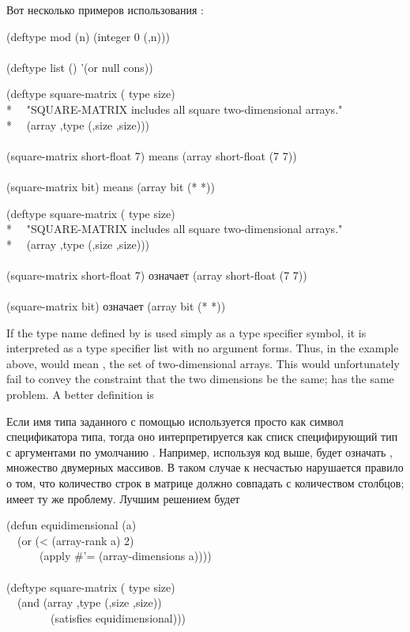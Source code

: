 \begin{defmac}
Вот несколько примеров использования :
\begin{lisp}
(deftype mod (n) {\Xbq}(integer 0 (,n))) \\
 \\
(deftype list () '(or null cons))
\end{lisp}


\begin{lisp}
(deftype square-matrix ( type size) \\*
~~"SQUARE-MATRIX includes all square two-dimensional arrays." \\*
~~{\Xbq}(array ,type (,size ,size))) \\
 \\
(square-matrix short-float 7)  \textrm{means}  (array short-float (7 7)) \\
 \\
(square-matrix bit)  \textrm{means}  (array bit (* *))
\end{lisp}

\begin{lisp}
(deftype square-matrix ( type size) \\*
~~"SQUARE-MATRIX includes all square two-dimensional arrays." \\*
~~{\Xbq}(array ,type (,size ,size))) \\
 \\
(square-matrix short-float 7)  \textrm{означает}  (array short-float (7 7)) \\
 \\
(square-matrix bit)  \textrm{означает}  (array bit (* *))
\end{lisp}
If the type name defined by  is used simply as a type
specifier symbol, it is interpreted as a type specifier list with
no argument forms.  Thus, in the example above, 
would mean , the set of two-dimensional arrays.
This would unfortunately fail to convey the constraint that the two
dimensions be the same;  has the same problem.
A better definition is

Если имя типа заданного с помощью  используется просто как символ
спецификатора типа, тогда оно интерпретируется как списк специфирующий тип с
аргументами по умолчанию \cdf{*}. Например, используя код выше,
 будет означать , множество двумерных
массивов.
В таком случае к несчастью нарушается правило о том, что количество строк в
матрице должно совпадать с количеством столбцов;  имеет
ту же проблему.
Лучшим решением будет
\begin{lisp}
(defun equidimensional (a) \\
~~(or (< (array-rank a) 2) \\
~~~~~~(apply \#'= (array-dimensions a)))) \\
 \\
(deftype square-matrix ( type size) \\
~~{\Xbq}(and (array ,type (,size ,size)) \\
~~~~~~~~(satisfies equidimensional)))
\end{lisp}


\end{defmac}
